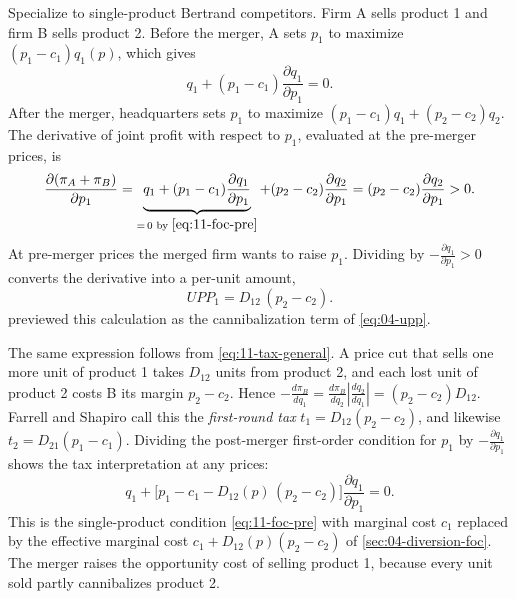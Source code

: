  Specialize to single-product Bertrand competitors. Firm A sells product 1 and firm B
sells product 2. Before the merger, A sets $p_1$ to maximize $(p_1 - c_1)q_1(p)$, which gives
\begin{equation}\label{eq:11-foc-pre}
  q_1 + (p_1 - c_1)\frac{\partial q_1}{\partial p_1} = 0 .
\end{equation}
After the merger, headquarters sets $p_1$ to maximize $(p_1 - c_1)q_1 + (p_2 - c_2)q_2$. The derivative of joint
profit with respect to $p_1$, evaluated at the pre-merger prices, is
\begin{equation*}
  \frac{\partial(\pi_A + \pi_B)}{\partial p_1}
  = \underbrace{q_1 + (p_1 - c_1)\frac{\partial q_1}{\partial p_1}}_{=\,0 \text{ by } \eqref{eq:11-foc-pre}}
    + (p_2 - c_2)\frac{\partial q_2}{\partial p_1}
  = (p_2 - c_2)\frac{\partial q_2}{\partial p_1} > 0 .
\end{equation*}
At pre-merger prices the merged firm wants to raise $p_1$. Dividing by $-\frac{\partial q_1}{\partial p_1} > 0$
converts the derivative into a per-unit amount,
\begin{equation}\label{eq:11-upp}
  \mathit{UPP}_1 = D_{12}\,(p_2 - c_2) .
\end{equation}
 previewed this calculation as the cannibalization term of \eqref{eq:04-upp}.

The same expression follows from \eqref{eq:11-tax-general}. A price cut that sells one more unit of product 1 takes
$D_{12}$ units from product 2, and each lost unit of product 2 costs B its margin $p_2 - c_2$. Hence
$-\frac{d\pi_B}{dq_1} = \frac{d\pi_B}{dq_2}\left|\frac{dq_2}{dq_1}\right| = (p_2 - c_2)D_{12}$. Farrell and Shapiro
call this the \emph{first-round tax} $t_1 = D_{12}(p_2 - c_2)$, and likewise $t_2 = D_{21}(p_1 - c_1)$. Dividing the
post-merger first-order condition for $p_1$ by $-\frac{\partial q_1}{\partial p_1}$ shows the tax interpretation at
any prices:
\begin{equation}\label{eq:11-effective-cost}
  q_1 + \big[p_1 - c_1 - D_{12}(p)\,(p_2 - c_2)\big]\frac{\partial q_1}{\partial p_1} = 0 .
\end{equation}
This is the single-product condition \eqref{eq:11-foc-pre} with marginal cost $c_1$ replaced by the effective
marginal cost $c_1 + D_{12}(p)(p_2 - c_2)$ of \cref{sec:04-diversion-foc}. The merger raises the opportunity cost of selling product 1, because
every unit sold partly cannibalizes product 2.

